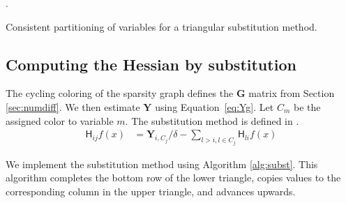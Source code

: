\documentclass[article]{jss}\usepackage[]{graphicx}\usepackage[]{color}
\newcommand{\hess}[2]{\mathsf{H}_{#1}#2}
\newcommand{\Mat}[1]{\mathbf{#1}}
\begin{document}
\begin{algorithm}
  \begin{algorithmic}
    .
     
        \ELSE
        \ELSE
             \ENDIF
    \ENDIF
    \ENDFOR
    \ENDFOR
    \end{algorithmic}
    \caption{Consistent partitioning of variables for a triangular
      substitution method.}\label{alg:coloring}
    \end{algorithm}


\subsection[Computing the Hessian by substitution]{Computing the Hessian by substitution}

The cycling coloring of the sparsity graph defines the $\Mat{G}$
matrix from Section \ref{sec:numdiff}.  We then estimate $\Mat{Y}$
using Equation~\ref{eq:Yg}.   Let $C_m$ be the assigned color to
variable $m$.  The substitution method is defined in
\citet[Equation 6.1]{ColemanMore1984}.
\begin{align}
  \label{eq:subst}
  \hess{ij}{f(x)}&=\Mat{Y}_{i,C_j}/\delta - \sum_{l>i,l\in C_j}\hess{li}{f(x)}
\end{align}

We implement the substitution method using Algorithm \ref{alg:subst}.
This algorithm completes the bottom row of the lower triangle, copies
values to the corresponding column in the upper triangle, and advances upwards.
\end{document}
